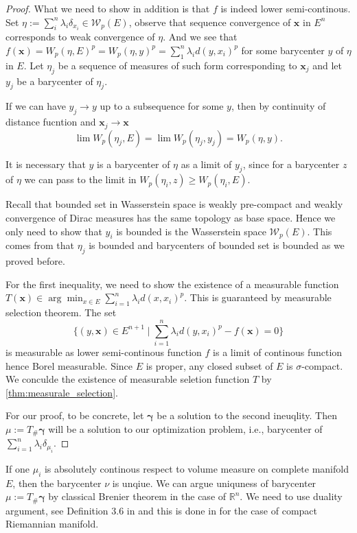 \begin{proof}
	What we need to show in addition is that $f$ is indeed lower semi-continous. Set $\eta:= \sum_i^{n}\lambda_i \delta_{x_i} \in \mathcal{W}_p(E)$, observe that sequence convergence of $\boldsymbol{x}$ in $E^n$ corresponds to weak convergence of $\eta$. And we see that $f(\boldsymbol{x}) = W_p(\eta, E)^p=W_p(\eta, y)^p = \sum_{1}^{n} \lambda_i d(y, x_i)^p$ for some barycenter $y$ of $\eta$ in $E$. Let $\eta_j$ be a sequence of measures of such form corresponding to $\boldsymbol{x}_j$ and let $y_j$ be a barycenter of $\eta_j$.

	If we can have $y_j \rightarrow y$ up to a subsequence for some $y$, then by continuity of distance fucntion and $\boldsymbol{x}_j \rightarrow \boldsymbol{x}$
	\[
		\lim W_p(\eta_j, E) = \lim W_p(\eta_j, y_j) =  W_p(\eta, y).
	\]

	It is necessary that $y$ is a barycenter of $\eta$ as a limit of $y_j$, since for a barycenter $z$ of $\eta$ we can pass to the limit in $W_p(\eta_i, z) \geq W_p(\eta_i, E)$.


	Recall that bounded set in Wasserstein space is weakly pre-compact and weakly convergence of Dirac measures has the same topology as base space. Hence we only need to show that $y_i$ is bounded is the Wasserstein space $\mathcal{W}_p(E)$. This comes from that $\eta_j$ is bounded and barycenters of bounded set is bounded as we proved before.

	For the first inequality, we need to show the existence of a measurable function $T(\boldsymbol{x}) \in \arg \min_{x \in E} \sum_{i=1}^{n} \lambda_i d(x, x_i)^p$. This is guaranteed by measurable selection theorem. The set
	\[
		\{
		(y,\boldsymbol{x}) \in E^{n+1}\mid \sum_{i=1}^{n} \lambda_i d(y,x_i)^p - f(\boldsymbol{x}) = 0
		\}
	\]
	is measurable as lower semi-continous function $f$ is a limit of continous function hence Borel measurable. Since $E$ is proper, any closed subset of $E$ is $\sigma$-compact. We conculde the existence of measurable seletion function $T$ by \cref{thm:measurale_selection}.

	For our proof, to be concrete, let $\boldsymbol \gamma$ be a solution to the second ineuqlity. Then $\mu:= T_{\#}\boldsymbol \gamma$ will be a solution to our optimization problem, i.e., barycenter of $\sum_{i=1}^{n}\lambda_i \delta_{\mu_i}$.
\end{proof}

\begin{rmk}
	If one $\mu_i$ is absolutely continous respect to volume measure on complete manifold $E$, then the barycenter $\nu$ is unqiue.
	We can argue uniquness of barycenter $\mu:= T_{\#}\boldsymbol \gamma$ by classical Brenier theorem in the case of $\mathbb{R}^n$.
	We need to use duality argument, see Definition 3.6 in \cite{agueh2011barycenters} and this is done in \cite{kim2015multi} for the case of compact Riemannian manifold.
\end{rmk}
